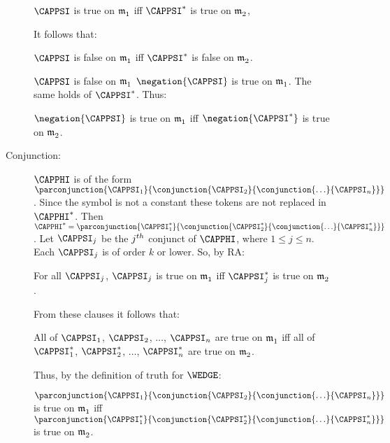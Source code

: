 \begin{PROOF}
\begin{description}
\begin{description}
\begin{center}
$\CAPPSI$ is true on $\mathfrak{m^{\mathrm{}}_{\mathrm{1}}}$ iff $\CAPPSI^*$ is true on $\mathfrak{m^{\mathrm{}}_{\mathrm{2}}}$,
\end{center}

It follows that:

\begin{center}
$\CAPPSI$ is false on $\mathfrak{m^{\mathrm{}}_{\mathrm{1}}}$ iff $\CAPPSI^*$ is false on $\mathfrak{m^{\mathrm{}}_{\mathrm{2}}}$.
\end{center}

$\CAPPSI$ is false on $\mathfrak{m^{\mathrm{}}_{\mathrm{1}}}$ \Iff $\negation{\CAPPSI}$ is true on $\mathfrak{m^{\mathrm{}}_{\mathrm{1}}}$.
The same holds of $\CAPPSI^*$.
Thus:

\begin{center}
$\negation{\CAPPSI}$ is true on $\mathfrak{m^{\mathrm{}}_{\mathrm{1}}}$ iff $\negation{\CAPPSI^*}$ is true on $\mathfrak{m^{\mathrm{}}_{\mathrm{2}}}$.
\end{center}

\item[Conjunction:] $\CAPPHI$ is of the form $\parconjunction{\CAPPSI_1}{\conjunction{\CAPPSI_2}{\conjunction{\ldots}{\CAPPSI_{\integer{n}}}}}$. 
Since the symbol \mention{$\WEDGE$} is not a constant these tokens are not replaced in $\CAPPHI^*$.
Then $\CAPPHI^*=\parconjunction{\CAPPSI_1^*}{\conjunction{\CAPPSI_2^*}{\conjunction{\ldots}{\CAPPSI_{\integer{n}}^*}}}$. 
Let $\CAPPSI_{\integer{j}}$ be the $j^{th}$ conjunct of $\CAPPHI$, where $1\leq j\leq n$.
Each $\CAPPSI_{\integer{j}}$ is of order $k$ or lower.
So, by RA:

\begin{center}
For all $\CAPPSI_{\integer{j}}$, $\CAPPSI_j$ is true on $\mathfrak{m^{\mathrm{}}_{\mathrm{1}}}$ iff $\CAPPSI_j^*$ is true on $\mathfrak{m^{\mathrm{}}_{\mathrm{2}}}$.
\end{center}

From these  clauses it follows that:

\begin{center}
All of $\CAPPSI_1$, $\CAPPSI_2$, $\ldots$, $\CAPPSI_{\integer{n}}$ are true on $\mathfrak{m^{\mathrm{}}_{\mathrm{1}}}$ iff all of $\CAPPSI_1^*$, $\CAPPSI_2^*$, $\ldots$, $\CAPPSI_{\integer{n}}^*$ are true on $\mathfrak{m^{\mathrm{}}_{\mathrm{2}}}$.
\end{center}

Thus, by the definition of truth for $\WEDGE$:

\begin{center}
$\parconjunction{\CAPPSI_1}{\conjunction{\CAPPSI_2}{\conjunction{\ldots}{\CAPPSI_{\integer{n}}}}}$ is true on $\mathfrak{m^{\mathrm{}}_{\mathrm{1}}}$ iff  $\parconjunction{\CAPPSI_1^*}{\conjunction{\CAPPSI_2^*}{\conjunction{\ldots}{\CAPPSI_{\integer{n}}^*}}}$ is true on $\mathfrak{m^{\mathrm{}}_{\mathrm{2}}}$.
\end{center}


\end{description}
\end{description}
\end{PROOF}
